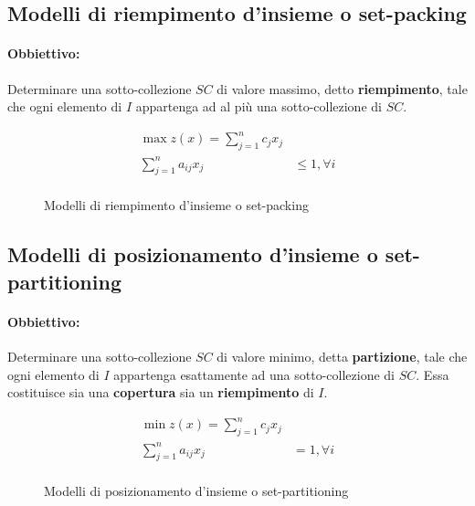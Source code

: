 \documentclass[\main/main.tex]{subfiles}
\begin{document}
\subsection{Modelli di riempimento d'insieme o set-packing}
\paragraph*{Obbiettivo:} Determinare una sotto-collezione $SC$ di valore massimo, detto \textbf{riempimento}, tale che ogni elemento di $I$ appartenga ad al più una sotto-collezione di $SC$.


\begin{figure}
  \begin{align*}
    \max z(x) = \sum_{j=1}^n c_j x_j            \\
    \sum_{j=1}^n a_{ij} x_j & \leq 1, \forall i \\
  \end{align*}
  \caption{Modelli di riempimento d'insieme o set-packing}
\end{figure}

\subsection{Modelli di posizionamento d'insieme o set-partitioning}
\paragraph*{Obbiettivo:} Determinare una sotto-collezione $SC$ di valore minimo, detta \textbf{partizione}, tale che ogni elemento di $I$ appartenga esattamente ad una sotto-collezione di $SC$. Essa costituisce sia una \textbf{copertura} sia un \textbf{riempimento} di $I$.

\begin{figure}
  \begin{align*}
    \min z(x) = \sum_{j=1}^n c_j x_j         \\
    \sum_{j=1}^n a_{ij} x_j & = 1, \forall i \\
  \end{align*}
  \caption{Modelli di posizionamento d'insieme o set-partitioning}
\end{figure}
\end{document}
